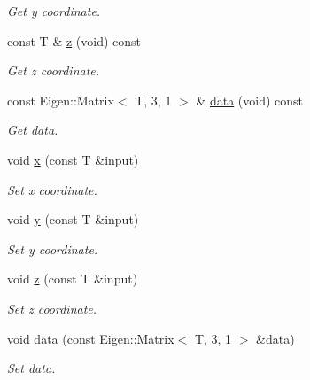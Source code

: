 \begin{DoxyCompactItemize}
\begin{DoxyCompactList}\small\item\em Get y coordinate. \end{DoxyCompactList}\item 
\mbox{\label{classddd_1_1row_object_a8d1d3c3217a0ac951f90e39d980faef4}} 
const T \& \hyperlink{classddd_1_1row_object_a8d1d3c3217a0ac951f90e39d980faef4}{z} (void) const
\begin{DoxyCompactList}\small\item\em Get z coordinate. \end{DoxyCompactList}\item 
\mbox{\label{classddd_1_1row_object_a30e3d89f19ec4001c9e70d0faaa6c579}} 
const Eigen\+::\+Matrix$<$ T, 3, 1 $>$ \& \hyperlink{classddd_1_1row_object_a30e3d89f19ec4001c9e70d0faaa6c579}{data} (void) const
\begin{DoxyCompactList}\small\item\em Get data. \end{DoxyCompactList}\item 
void \hyperlink{classddd_1_1row_object_afe92fca2bf490cdef9b684bd3847d7eb}{x} (const T \&input)
\begin{DoxyCompactList}\small\item\em Set x coordinate. \end{DoxyCompactList}\item 
void \hyperlink{classddd_1_1row_object_aeb7d81b5fcffd7d8a17fea5b85c37b43}{y} (const T \&input)
\begin{DoxyCompactList}\small\item\em Set y coordinate. \end{DoxyCompactList}\item 
void \hyperlink{classddd_1_1row_object_a42c5766595f9ccb58435d97b8a9e0612}{z} (const T \&input)
\begin{DoxyCompactList}\small\item\em Set z coordinate. \end{DoxyCompactList}\item 
void \hyperlink{classddd_1_1row_object_ae90cbcdfbe32788d18f051a78f8188a6}{data} (const Eigen\+::\+Matrix$<$ T, 3, 1 $>$ \&data)
\begin{DoxyCompactList}\small\item\em Set data. \end{DoxyCompactList}\item 

\end{DoxyCompactItemize}
